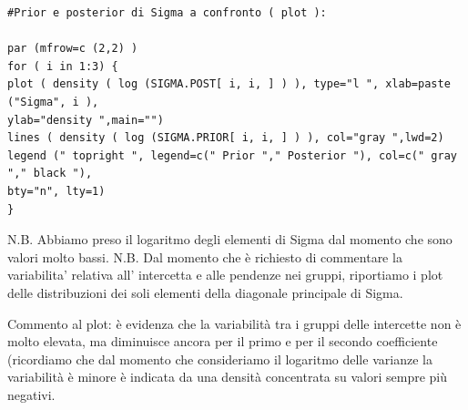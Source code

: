 \begin{lstlisting}[style=R]
#Prior e posterior di Sigma a confronto ( plot ):

par (mfrow=c (2,2) )
for ( i in 1:3) {
plot ( density ( log (SIGMA.POST[ i, i, ] ) ), type="l ", xlab=paste ("Sigma", i ),
ylab="density ",main="")
lines ( density ( log (SIGMA.PRIOR[ i, i, ] ) ), col="gray ",lwd=2)
legend (" topright ", legend=c(" Prior "," Posterior "), col=c(" gray "," black "),
bty="n", lty=1)
}
\end{lstlisting}

N.B. Abbiamo preso il logaritmo degli elementi di Sigma dal momento che sono valori 
molto bassi. N.B. Dal momento che è richiesto di commentare la variabilita' 
relativa all' intercetta e alle pendenze nei gruppi, 
riportiamo i plot delle distribuzioni dei soli elementi della diagonale principale di 
Sigma. 

Commento al plot: è evidenza che la variabilità tra i gruppi delle intercette non è 
molto elevata, ma diminuisce ancora per il primo e per il secondo coefficiente 
(ricordiamo che dal momento che consideriamo il logaritmo delle varianze la 
variabilità è minore è indicata da una densità concentrata su valori sempre più 
negativi.


